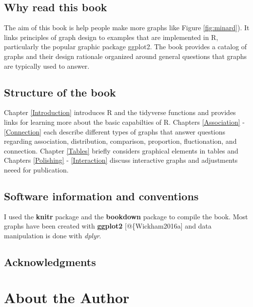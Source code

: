 \documentclass[]{krantz}
\theoremstyle{definition}
\theoremstyle{definition}
\theoremstyle{definition}
\theoremstyle{remark}
\let\BeginKnitrBlock\begin \let\EndKnitrBlock\end
\begin{document}
\section*{Why read this book}\label{why-read-this-book}


The aim of this book is help people make more graphs like Figure
\ref{fig:minard}). It links principles of graph design to examples that
are implemented in R, particularly the popular graphic package ggplot2.
The book provides a catalog of graphs and their design rationale
organized around general questions that graphs are typically used to
answer.

\section*{Structure of the book}\label{structure-of-the-book}


Chapter \ref{Introduction} introduces R and the tidyverse functions and
provides links for learning more about the basic capabilties of R.
Chapters \ref{Association} - \ref{Connection} each describe different
types of graphs that answer questions regarding association,
distribution, comparison, proportion, fluctionation, and connection.
Chapter \ref{Tables} briefly considers graphical elements in tables and
Chapters \ref{Polishing} - \ref{Interaction} discuss interactive graphs
and adjustments neeed for publication.

\section*{Software information and
conventions}\label{software-information-and-conventions}


I used the \textbf{knitr} package \citep{xie2015} and the
\textbf{bookdown} package \citep{R-bookdown} to compile
the book. Most graphs have been created with \textbf{ggplot2}
{[}@\{Wickham2016a{]} and data manipulation is done with \emph{dplyr}.

\section*{Acknowledgments}\label{acknowledgments}


\BeginKnitrBlock{flushright}
\EndKnitrBlock{flushright}

\chapter*{About the Author}\label{about-the-author}
\end{document}
